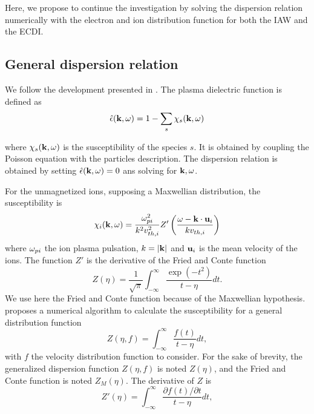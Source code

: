   Here, we propose to continue the investigation by solving the dispersion relation numerically with the electron and ion distribution function for both the \ac{IAW} and the \ac{ECDI}.
  
  
  \subsection{General dispersion relation}
    \label{sec-geneDR}
    
    We follow the development presented in \citet{ducrocq2006,cavalier2013,lafleur2016}.
    The plasma dielectric function is defined as
    \begin{equation} \label{eq-de}
      \hat\epsilon({\mathbf k},\omega) = 1 - \sum_s \chi_s({\mathbf k},\omega)
    \end{equation}
    
    where $\chi_s({\mathbf k}, \omega)$ is the susceptibility of the species $s$.
    It is obtained by coupling the Poisson equation with the particles description.
    The dispersion relation is obtained by setting $  \hat\epsilon({\mathbf k},\omega) =0$ ans solving for ${\mathbf k},\omega$.
    
    
    For the unmagnetized ions, supposing a Maxwellian distribution, the susceptibility is
    \begin{equation} \label{eq-susceptibility}
      \chi_i({\mathbf k},\omega) = \frac{\omega_{pi}^2}{k^2 v^2_{th, i}} Z'\left( \frac{\omega - {\mathbf k} \cdot {\mathbf u_{i}}}{k v_{th, i}}  \right)
    \end{equation}
    where $\omega_{pi}$ the ion plasma pulsation, $k=\lvert{\mathbf k}\rvert$ and ${\mathbf u_i}$ is the mean velocity of the ions.
    The function $Z'$ is the derivative of the Fried and Conte function \citep{fried1961}
    \begin{equation} \label{eq-friedandConte}
      Z(\eta) = \frac{1}{\sqrt{\pi}} \int_{-\infty}^{\infty} \frac{\exp{(-t^2)}}{t - \eta} dt.
    \end{equation}
    We use here the Fried and Conte function because of the Maxwellian hypothesis.
    \citet{xie2013} proposes a numerical algorithm to calculate the susceptibility for a general distribution function
    \begin{equation} \label{eq-general}
      Z(\eta, f) = \int_{-\infty}^{\infty} \frac{f(t)}{t - \eta} dt,
    \end{equation}
    with $f$ the velocity distribution function to consider.
    For the sake of brevity, the generalized dispersion function $Z(\eta,f)$ is noted $Z(\eta)$, and the Fried and Conte function is noted $Z_M(\eta)$.
    The derivative of $Z$ is
    \begin{equation} \label{eq-derivatives}
      Z'(\eta) = \int_{-\infty}^{\infty} \frac{\partial f(t) / \partial t}{t - \eta} dt,
    \end{equation}
    
